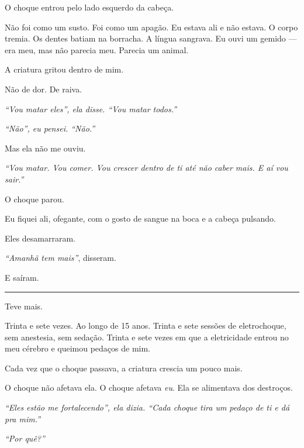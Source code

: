 \noindent O choque entrou pelo lado esquerdo da cabeça.

\noindent Não foi como um susto. Foi como um apagão. Eu estava ali e não estava. O corpo tremia. Os dentes batiam na borracha. A língua sangrava. Eu ouvi um gemido --- era meu, mas não parecia meu. Parecia um animal.

\noindent A criatura gritou dentro de mim.

\noindent Não de dor.
De raiva.

\noindent \textit{\textquotedblleft{}Vou matar eles\textquotedblright{}\textit{, ela disse. }\textquotedblleft{}Vou matar todos.\textquotedblright{}}

\noindent \textit{\textquotedblleft{}Não\textquotedblright{}\textit{, eu pensei. }\textquotedblleft{}Não.\textquotedblright{}}

\noindent Mas ela não me ouviu.

\noindent \textit{\textquotedblleft{}Vou matar. Vou comer. Vou crescer dentro de ti até não caber mais. E aí vou sair.\textquotedblright{}}

\noindent O choque parou.

\noindent Eu fiquei ali, ofegante, com o gosto de sangue na boca e a cabeça pulsando.

\noindent Eles desamarraram.

\noindent \textit{\textquotedblleft{}Amanhã tem mais\textquotedblright{}}, disseram.

\noindent E saíram.

\vspace{0.5em}\noindent\rule{\textwidth}{0.5pt}\vspace{0.5em}

\noindent Teve mais.

\noindent Trinta e sete vezes. Ao longo de 15 anos. Trinta e sete sessões de eletrochoque, sem anestesia, sem sedação. Trinta e sete vezes em que a eletricidade entrou no meu cérebro e queimou pedaços de mim.

\noindent Cada vez que o choque passava, a criatura crescia um pouco mais.

\noindent O choque não afetava ela.
O choque afetava \textit{eu}.
Ela se alimentava dos destroços.

\noindent \textit{\textquotedblleft{}Eles estão me fortalecendo\textquotedblright{}\textit{, ela dizia. }\textquotedblleft{}Cada choque tira um pedaço de ti e dá pra mim.\textquotedblright{}}

\noindent \textit{\textquotedblleft{}Por quê?\textquotedblright{}}

